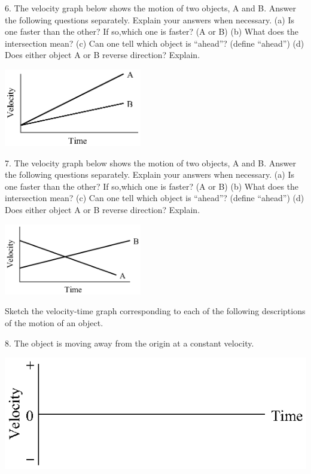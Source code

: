 6. The velocity graph below shows the motion of two objects, A and B. Answer
the following questions separately. Explain your answers when necessary. (a)
Is one faster than the other? If so,which one is faster? (A or B) (b) What does
the intersection mean? (c) Can one tell which object is ``ahead''?
(define ``ahead'') (d) Does either object A or B reverse direction?
Explain.

\vspace{0.3cm}
{\par\raggedright \includegraphics[width=0.45\textwidth]{velocity/velocity_fig13.eps} \par}
\answerspace{0.6cm}

7. The velocity graph below shows the motion of two objects, A and B. Answer
the following questions separately. Explain your answers when necessary. (a)
Is one faster than the other? If so,which one is faster? (A or B) (b) What does
the intersection mean? (c) Can one tell which object is ``ahead''?
(define ``ahead'') (d) Does either object A or B reverse direction?
Explain.

\vspace{0.3cm}
{\par\raggedright \includegraphics[width=0.45\textwidth]{velocity/velocity_fig14.eps} \par}
\answerspace{0.6cm}

\pagebreak[2]
Sketch the velocity-time graph corresponding to each of the following descriptions
of the motion of an object.

8. The object is moving away from the origin at a constant velocity.

\vspace{0.3cm}
{\par\centering \includegraphics{velocity/velocity_fig15.eps} \par}
\vspace{0.3cm}

